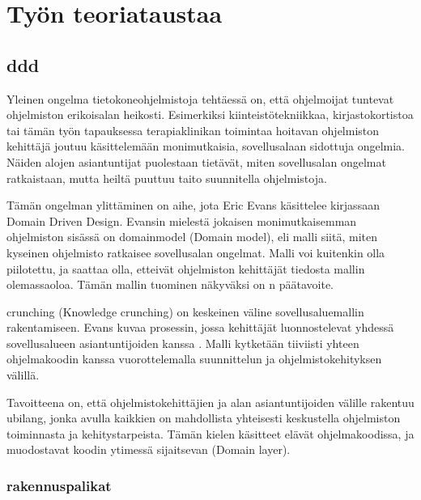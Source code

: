 \hypertarget{tyuxf6n-teoriataustaa}{%
\chapter{Työn teoriataustaa}\label{tyuxf6n-teoriataustaa}}

\hypertarget{section}{%
\section{\texorpdfstring{\gls{ddd}}{}}\label{section}}

Yleinen ongelma tietokoneohjelmistoja tehtäessä on, että ohjelmoijat
tuntevat ohjelmiston erikoisalan heikosti. Esimerkiksi
kiinteistötekniikkaa, kirjastokortistoa tai tämän työn tapauksessa
terapiaklinikan toimintaa hoitavan ohjelmiston kehittäjä joutuu
käsittelemään monimutkaisia, sovellusalaan sidottuja ongelmia. Näiden
alojen asiantuntijat puolestaan tietävät, miten sovellusalan ongelmat
ratkaistaan, mutta heiltä puuttuu taito suunnitella ohjelmistoja.

Tämän ongelman ylittäminen on aihe, jota Eric Evans käsittelee
kirjassaan Domain Driven Design.\cite{evans:ddd} Evansin mielestä
jokaisen monimutkaisemman ohjelmiston sisässä on \gls{domainmodel}
(Domain model), eli malli siitä, miten kyseinen ohjelmisto ratkaisee
sovellusalan ongelmat. Malli voi kuitenkin olla piilotettu, ja saattaa
olla, etteivät ohjelmiston kehittäjät tiedosta mallin olemassaoloa.
Tämän mallin tuominen näkyväksi on n päätavoite.

\Gls{crunching} (Knowledge crunching) on keskeinen väline
sovellusaluemallin rakentamiseen. Evans kuvaa prosessin, jossa
kehittäjät luonnostelevat yhdessä sovellusalueen asiantuntijoiden kanssa
. Malli kytketään tiiviisti
yhteen ohjelmakoodin kanssa vuorottelemalla suunnittelun ja
ohjelmistokehityksen välillä. \cite[s. 13]{evans:ddd}

Tavoitteena on, että ohjelmistokehittäjien ja alan asiantuntijoiden
välille rakentuu \gls{ubilang}, jonka avulla kaikkien on mahdollista
yhteisesti keskustella ohjelmiston toiminnasta ja kehitystarpeista.
Tämän kielen käsitteet elävät ohjelmakoodissa, ja muodostavat koodin
ytimessä sijaitsevan
(Domain layer).

\hypertarget{rakennuspalikat}{%
\subsection{\texorpdfstring{
rakennuspalikat}{ rakennuspalikat}}\label{rakennuspalikat}}

